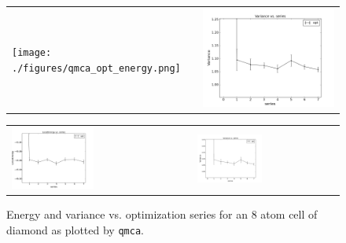 \begin{figure}
  \centering
  \ifdefined\HCode%
  \begin{xltabular}[l]{1024pt}{X X}
    \texttt{[image: ./figures/qmca\_opt\_energy.png]}&
    \includegraphics[trim=2mm 0mm 4mm 0mm,clip,width=512pt]{./figures/qmca_opt_variance.png}\\
  \end{xltabular}
\else%
  \begin{xltabular}[l]{\textwidth}{X X}
    \includegraphics[trim=0mm 0mm 4mm 0mm,clip,width=0.47\textwidth]{./figures/qmca_opt_energy.pdf}&
    \includegraphics[trim=2mm 0mm 4mm 0mm,clip,width=0.47\textwidth]{./figures/qmca_opt_variance.png}\\
    \end{xltabular}
\fi%
  \caption{Energy and variance vs. optimization series for an 8 atom cell of diamond as plotted by \texttt{qmca}.}%
  \label{fig:qmca_opt_ev}%
\end{figure}

